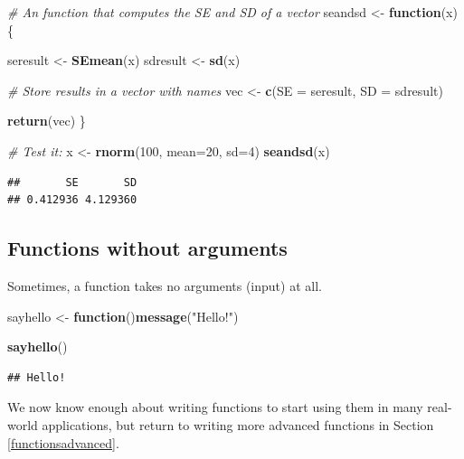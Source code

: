 \documentclass[]{book}
\newenvironment{Shaded}{\begin{snugshade}}{\end{snugshade}}
\newcommand{\CommentTok}[1]{\textcolor[rgb]{0.56,0.35,0.01}{\textit{#1}}}
\newcommand{\ControlFlowTok}[1]{\textcolor[rgb]{0.13,0.29,0.53}{\textbf{#1}}}
\newcommand{\DataTypeTok}[1]{\textcolor[rgb]{0.13,0.29,0.53}{#1}}
\newcommand{\DecValTok}[1]{\textcolor[rgb]{0.00,0.00,0.81}{#1}}
\newcommand{\KeywordTok}[1]{\textcolor[rgb]{0.13,0.29,0.53}{\textbf{#1}}}
\newcommand{\NormalTok}[1]{#1}
\newcommand{\StringTok}[1]{\textcolor[rgb]{0.31,0.60,0.02}{#1}}
\begin{document}
\begin{Shaded}
\begin{Highlighting}[]
\CommentTok{# An function that computes the SE and SD of a vector}
\NormalTok{seandsd <-}\StringTok{ }\ControlFlowTok{function}\NormalTok{(x)\{}
  
\NormalTok{  seresult <-}\StringTok{ }\KeywordTok{SEmean}\NormalTok{(x)}
\NormalTok{  sdresult <-}\StringTok{ }\KeywordTok{sd}\NormalTok{(x)}

  \CommentTok{# Store results in a vector with names}
\NormalTok{  vec <-}\StringTok{ }\KeywordTok{c}\NormalTok{(}\DataTypeTok{SE =}\NormalTok{ seresult, }\DataTypeTok{SD =}\NormalTok{ sdresult)}

\KeywordTok{return}\NormalTok{(vec)}
\NormalTok{\}}

\CommentTok{# Test it:}
\NormalTok{x <-}\StringTok{ }\KeywordTok{rnorm}\NormalTok{(}\DecValTok{100}\NormalTok{, }\DataTypeTok{mean=}\DecValTok{20}\NormalTok{, }\DataTypeTok{sd=}\DecValTok{4}\NormalTok{)}
\KeywordTok{seandsd}\NormalTok{(x)}
\end{Highlighting}
\end{Shaded}

\begin{verbatim}
##       SE       SD 
## 0.412936 4.129360
\end{verbatim}

\hypertarget{functions-without-arguments}{%
\subsection{Functions without arguments}\label{functions-without-arguments}}

Sometimes, a function takes no arguments (input) at all.

\begin{Shaded}
\begin{Highlighting}[]
\NormalTok{sayhello <-}\StringTok{ }\ControlFlowTok{function}\NormalTok{()}\KeywordTok{message}\NormalTok{(}\StringTok{"Hello!"}\NormalTok{)}

\KeywordTok{sayhello}\NormalTok{()}
\end{Highlighting}
\end{Shaded}

\begin{verbatim}
## Hello!
\end{verbatim}

We now know enough about writing functions to start using them in many real-world applications, but return to writing more advanced functions in Section \ref{functionsadvanced}.
\end{document}
